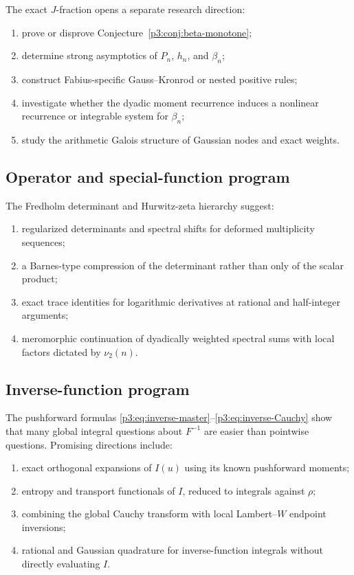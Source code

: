\documentclass[11pt,oneside]{article}
\theoremstyle{definition}
\begin{document}
The exact \(J\)-fraction opens a separate research direction:

\begin{enumerate}
\item prove or disprove Conjecture~\ref{p3:conj:beta-monotone};
\item determine strong asymptotics of \(P_n\), \(h_n\), and \(\beta_n\);
\item construct Fabius-specific Gauss--Kronrod or nested positive rules;
\item investigate whether the dyadic moment recurrence induces a nonlinear recurrence or
      integrable system for \(\beta_n\);
\item study the arithmetic Galois structure of Gaussian nodes and exact weights.
\end{enumerate}

\subsection{Operator and special-function program}

The Fredholm determinant and Hurwitz-zeta hierarchy suggest:

\begin{enumerate}
\item regularized determinants and spectral shifts for deformed multiplicity sequences;
\item a Barnes-type compression of the determinant rather than only of the scalar product;
\item exact trace identities for logarithmic derivatives at rational and half-integer
      arguments;
\item meromorphic continuation of dyadically weighted spectral sums with local factors
      dictated by \(\nu_2(n)\).
\end{enumerate}

\subsection{Inverse-function program}

The pushforward formulas \eqref{p3:eq:inverse-master}--\eqref{p3:eq:inverse-Cauchy} show that
many global integral questions about \(F^{-1}\) are easier than pointwise questions.
Promising directions include:

\begin{enumerate}
\item exact orthogonal expansions of \(I(u)\) using its known pushforward moments;
\item entropy and transport functionals of \(I\), reduced to integrals against \(\rho\);
\item combining the global Cauchy transform with local Lambert--\(W\) endpoint inversions;
\item rational and Gaussian quadrature for inverse-function integrals without directly
      evaluating \(I\).
\end{enumerate}
\end{document}

